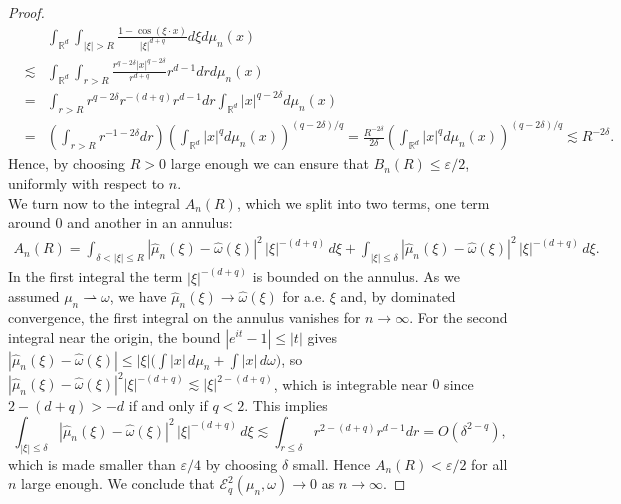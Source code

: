 \documentclass[12pt,a4paper,oneside]{amsart}
\theoremstyle{plain}
\theoremstyle{definition}
\numberwithin{equation}{section}
\numberwithin{figure}{section}
\numberwithin{table}{section}
\theoremstyle{remark}
\newcommand{\R}{\mathbb{R}}
\begin{document}
\begin{proof}
  \begin{eqnarray*}
      && \int_{\R^d} \int_{|\xi|> R} \frac{1-\cos(\xi \cdot x)}{|\xi|^{d+q}} d\xi d \mu_n(x) \\
&\lesssim&
      \int_{\R^d} \int_{r> R} \frac{r^{q- 2 \delta} |x|^{q-2\delta}}{r^{d+q}} r^{d-1} dr d \mu_n(x)\\
      &=&  \int_{r> R} r^{q-2 \delta} r^{-(d+q)} r^{d-1} dr \int_{\R^d} |x|^{q-2\delta}  d \mu_n(x) \\
      &=& \left( \int_{r> R}  r^{-1-2\delta }dr \right) \left (\int_{\R^d} |x|^{q}  d \mu_n(x) \right)^{(q-2\delta)/q} = \frac{R^{-2\delta}}{2 \delta} \left (\int_{\R^d} |x|^{q}  d \mu_n(x) \right)^{(q-2\delta)/q} \lesssim R^{-2\delta}.
  \end{eqnarray*}     
  Hence, by choosing $R>0$ large enough we can ensure that $B_n(R) \leq \varepsilon/2$, uniformly with respect to $n$. \\
  We turn now to the integral $A_n(R)$, which we split into two terms, one term around $0$ and another in an annulus:
    \begin{eqnarray*}
A_n(R) = \int_{\delta<|\xi|\leq R}
  |\hat{\mu}_n(\xi) - \hat{\omega}(\xi)|^2
  \,|\xi|^{-(d+q)}\, d\xi + \int_{|\xi|\leq \delta}
  |\hat{\mu}_n(\xi) - \hat{\omega}(\xi)|^2
  \,|\xi|^{-(d+q)}\, d\xi.
    \end{eqnarray*} 
    In the first integral  the term $|\xi|^{-(d+q)}$ is bounded on the annulus. As we assumed $\mu_n \rightharpoonup \omega$, we have $\hat \mu_n(\xi) \to \hat \omega(\xi)$ for a.e. $\xi$ and, by dominated convergence, the first integral on the annulus vanishes for $n\to \infty$. For the second integral near the origin, the bound $|e^{it}-1|\leq|t|$ gives
$|\hat\mu_n(\xi)-\hat\omega(\xi)|\leq|\xi|\bigl(\int|x|\,d\mu_n+\int|x|\,d\omega\bigr)$,
so $|\hat\mu_n(\xi)-\hat\omega(\xi)|^2 |\xi|^{-(d+q)}\lesssim|\xi|^{2-(d+q)}$, which is integrable near $0$
since $2-(d+q)>-d$ if and only if $q<2$. This implies
$$
\int_{|\xi|\leq \delta}
  |\hat{\mu}_n(\xi) - \hat{\omega}(\xi)|^2
  \,|\xi|^{-(d+q)}\, d\xi \lesssim \int_{r\leq \delta} r^{2-(d+q)} r^{d-1} dr =O(\delta^{2-q}),
$$
which is made smaller than $\varepsilon/4$ by choosing $\delta$ small.
Hence $A_n(R)<\varepsilon/2$ for all $n$ large enough. We conclude that $\mathcal E_q^2(\mu_n,\omega) \to 0$ as $n\to \infty$.
\end{proof}
\end{document}
